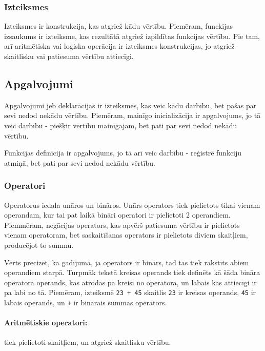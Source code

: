 \documentclass[12pt,a4paper]{report}
\begin{document}
\subsubsection{Izteiksmes}

Izteiksmes ir konstrukcija, kas atgriež kādu vērtību. Piemēram, funckijas izsaukums ir izteiksme, kas rezultātā atgriež izpildītas funkcijas vērtību. Pie tam, arī aritmētiska vai loģiska operācija ir izteiksmes konstrukcijas, jo atgriež skaitlisku vai patiesuma vērtību attiecīgi.

\subsection{Apgalvojumi}

Apgalvojumi jeb deklarācijas ir izteiksmes, kas veic kādu darbību, bet pašas par sevi nedod nekādu vērtību. Piemēram, mainīgo inicializācija ir apgalvojums, jo tā veic darbību - piešķir vērtību mainīgajam, bet pati par sevi nedod nekādu vērtību.

Funkcijas definīcija ir apgalvojums, jo tā arī veic darbību - reģistrē funkciju atmiņā, bet pati par sevi nedod nekādu vērtību.

\subsubsection{Operatori}

Operatorus iedala unāros un bināros. Unārs operators tiek pielietots tikai vienam operandam, kur tai pat laikā bināri operatori ir pielietoti 2 operandiem. Piemmēram, negācijas operators, kas apvērš patiesuma vērtību ir pielietots vienam operatoram, bet saskaitīšanas operators ir pielietots diviem skaitļiem, producējot to summu.

Vērts precizēt, ka gadījumā, ja operators ir binārs, tad tas tiek rakstīts abiem operandiem starpā. Turpmāk tekstā kreisas operands tiek definēts kā šāda bināra operatora operands, kas atrodas pa kreisi no operatora, un labais kas attiecīgi ir pa labi no tā. Piemēram, izteiksmē \texttt{23 + 45} skaitlis \texttt{23} ir kreisas operands, \texttt{45} ir labais operands, un \texttt{+} ir binārais summas operators. \\

\paragraph{Aritmētiskie operatori:} tiek pielietoti skaitļiem, un atgriež skaitlisku vērtību.
\end{document}
